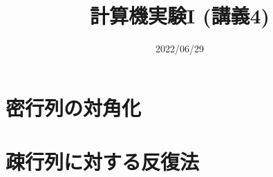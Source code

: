 \documentclass[10pt,dvipdfmx]{beamer}
\title{計算機実験I (講義4)}
\date{2022/06/29}
\begin{document}
\begin{frame}
  \titlepage
  \tableofcontents
\end{frame}

\section{密行列の対角化}


%

%











%


\section{疎行列に対する反復法}

%











% 
% 




\end{document}
